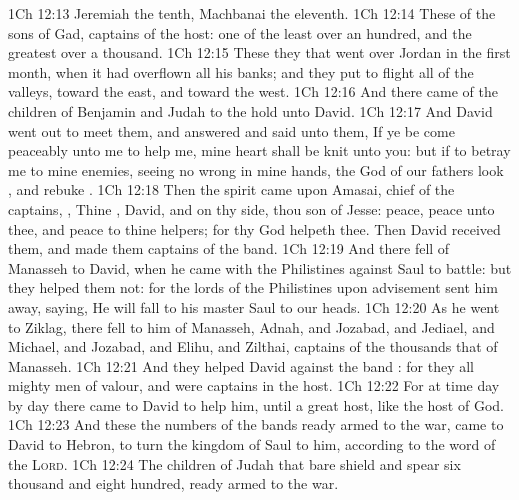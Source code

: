 \vs 1Ch 12:13 Jeremiah the tenth, Machbanai the eleventh.
\vs 1Ch 12:14 These  of the sons of Gad, captains of the host: one of the least  over an hundred, and the greatest over a thousand.
\vs 1Ch 12:15 These  they that went over Jordan in the first month, when it had overflown all his banks; and they put to flight all  of the valleys,  toward the east, and toward the west.
\vs 1Ch 12:16 And there came of the children of Benjamin and Judah to the hold unto David.
\vs 1Ch 12:17 And David went out to meet them, and answered and said unto them, If ye be come peaceably unto me to help me, mine heart shall be knit unto you: but if  to betray me to mine enemies, seeing  no wrong in mine hands, the God of our fathers look , and rebuke .
\vs 1Ch 12:18 Then the spirit came upon Amasai,  chief of the captains, , Thine , David, and on thy side, thou son of Jesse: peace, peace  unto thee, and peace  to thine helpers; for thy God helpeth thee. Then David received them, and made them captains of the band.
\vs 1Ch 12:19 And there fell  of Manasseh to David, when he came with the Philistines against Saul to battle: but they helped them not: for the lords of the Philistines upon advisement sent him away, saying, He will fall to his master Saul to  our heads.
\vs 1Ch 12:20 As he went to Ziklag, there fell to him of Manasseh, Adnah, and Jozabad, and Jediael, and Michael, and Jozabad, and Elihu, and Zilthai, captains of the thousands that  of Manasseh.
\vs 1Ch 12:21 And they helped David against the band : for they  all mighty men of valour, and were captains in the host.
\vs 1Ch 12:22 For at  time day by day there came to David to help him, until  a great host, like the host of God.
\vs 1Ch 12:23 And these  the numbers of the bands  ready armed to the war,  came to David to Hebron, to turn the kingdom of Saul to him, according to the word of the \textsc{Lord}.
\vs 1Ch 12:24 The children of Judah that bare shield and spear  six thousand and eight hundred, ready armed to the war.
